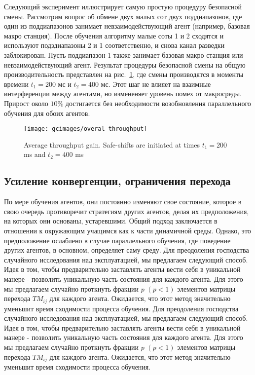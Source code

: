 Следующий эксперимент иллюстрирует самую простую процедуру безопасной смены. Рассмотрим вопрос об обмене двух малых сот двух поддиапазонов, где один из поддиапазонов занимает невзаимодействующий агент (например, базовая макро станция). После обучения алгоритму малые соты 1 и 2 сходятся и используют подздиапазоны 2 и 1 соответственно, и снова канал разведки заблокирован. Пусть поддиапазон 1 также занимает базовая макро станция или невзаимодействующий агент. Результат процедуры безопасной смены на общую производительность представлен на рис.~\ref{fig:safe_shift_overal_throughput}, где смены производятся в моменты времени $t_1=200$ мс и $t_2=400$ мс. Этот шаг не влияет на взаимные интерференции между агентами, но измененяет уровень помех от макросреды. Прирост около $10\%$ достигается без необходимости возобновления параллельного обучения для обоих агентов.

\begin{figure}[h!]
    \centering
    \texttt{[image: gcimages/overal\_throughput]}
    \caption{Average throughput gain. Safe-shifts are initiated at times $t_1=200$ ms and $t_2=400$ ms }
    \label{fig:safe_shift_overal_throughput}
\end{figure}

\subsection{Усиление конвергенции, ограничения перехода}
По мере обучения агентов, они постоянно изменяют свое состояние, которое в свою очередь противоречит стратегиям других агентов, делая их предположения, на которых они основаны, устаревшими. Общий подход заключается в отношении к окружающим учащимся как к части динамичной среды. Однако, это предположение ослаблено в случае параллельного обучения, где поведение других агентов, в основном, определяет саму среду.
Для преодоления господства случайного исследования над эксплуатацией, мы предлагаем следующий способ. Идея в том, чтобы предварительно заставлять агенты вести себя в уникальной манере - позволить уникальную часть состояния для каждого агента. Для этого мы предлагаем случайно проткнуть фракции $p$ $(p< 1)$ элементов матрицы перехода $TM_{ij}$ для каждого агента. Ожидается, что этот метод значительно уменьшит время сходимости процесса обучения.
Для преодоления господства случайного исследования над эксплуатацией, мы предлагаем следующий способ. Идея в том, чтобы предварительно заставлять агенты вести себя в уникальной манере - позволить уникальную часть состояния для каждого агента. Для этого мы предлагаем случайно проткнуть фракции $p$ $(p< 1)$ элементов матрицы перехода $TM_{ij}$ для каждого агента. Ожидается, что этот метод значительно уменьшит время сходимости процесса обучения.

